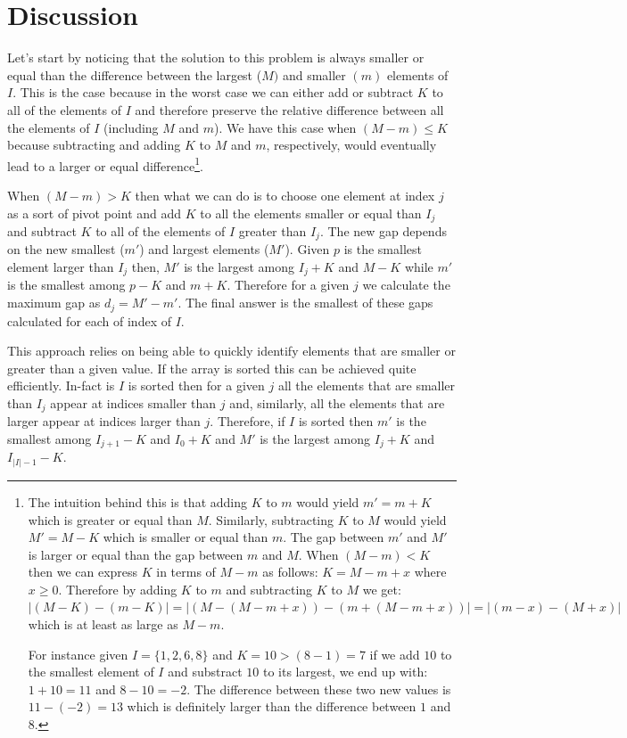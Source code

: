 \section{Discussion}
\label{smallest_range:sec:discussion}
Let's start by noticing that the solution to this problem is always smaller or equal 
than the difference between the largest ($M)$ and smaller  $(m)$ elements of $I$.
This is the case because in the worst case we can either add or subtract $K$ to all of the elements of $I$
and therefore preserve the relative difference between all the elements of $I$ (including $M$ and $m$).
We have this case when $(M-m) \leq K$ because subtracting and adding $K$ to $M$ and $m$, respectively, would
eventually lead to a larger or equal difference\footnote{The intuition behind this is that 
adding $K$ to $m$ would yield $m' = m+K$ which is greater or equal than $M$.
Similarly, subtracting $K$ to $M$ would yield $M' = M-K$ which is smaller or equal than $m$.
The gap between $m'$ and $M'$ is larger or equal than the gap between $m$ and $M$. 
When $(M-m) < K$ then we can express $K$ in terms of $M-m$ as follows: $K = M-m + x$ where $x \geq 0$.
Therefore by adding $K$ to $m$ and subtracting $K$ to $M$ we get:
$|(M-K) - (m-K)| = |(M-(M-m + x)) - (m + (M-m + x))| = |(m-x) - (M+x)|$
which is at least as large as $M-m$.

For instance given $I = \{1,2,6,8\}$ and $K = 10 > (8-1) = 7$ 
if we add $10$ to the smallest element of $I$ and substract $10$ to its largest,
we end up with: $1+10 = 11$ and $8-10=-2$. The difference between these two new values is $11-(-2) = 13$ which is definitely larger than the difference between $1$ and $8$.
}.

When $(M-m) > K$ then what we can do is to choose one element at index $j$ as a sort of pivot point and 
add $K$ to all the elements smaller or equal than $I_j$ and subtract $K$ to all of the elements of $I$ greater than $I_j$.
The new gap depends on the new smallest ($m'$) and largest elements ($M'$).
Given $p$ is the smallest element larger than $I_j$ then,
$M'$ is the largest among $I_j+K$ and $M-K$ while $m'$ is the smallest among $p - K$ and $m+K$.
Therefore for a given $j$ we calculate the maximum gap as $d_j = M'-m'$.
The final answer is the smallest of these gaps calculated for each of index of $I$.

This approach relies on being able to quickly identify elements
that are smaller or greater than a given value. 
If the array is sorted this can be achieved quite efficiently.
In-fact is $I$ is sorted then for a given $j$ all the elements that are smaller than $I_j$ appear at indices smaller than $j$ and, similarly,
all the elements that are larger appear at indices larger than $j$. 
Therefore, if $I$ is sorted then $m'$ is the smallest among $I_{j+1}-K$ and $I_0 +K$
and $M'$ is the largest among $I_j+K$ and $I_{|I|-1}-K$.

